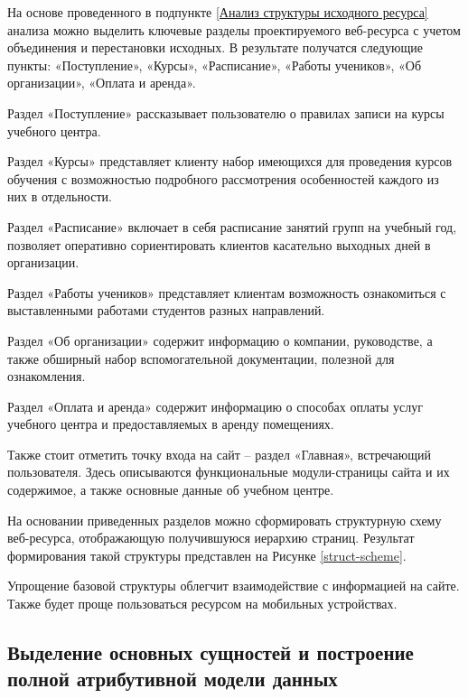 На основе проведенного в подпункте \ref{Анализ структуры исходного ресурса} анализа можно выделить ключевые разделы проектируемого веб-ресурса с учетом объединения и перестановки исходных.
В результате получатся следующие пункты: «Поступление», «Курсы», «Расписание», «Работы учеников», «Об организации», «Оплата и аренда».

Раздел «Поступление» рассказывает пользователю о правилах записи на курсы учебного центра.

Раздел «Курсы» представляет клиенту набор имеющихся для проведения курсов обучения с возможностью подробного рассмотрения особенностей каждого из них в отдельности.

Раздел «Расписание» включает в себя расписание занятий групп на учебный год, позволяет оперативно сориентировать клиентов касательно выходных дней в организации.

Раздел «Работы учеников» представляет клиентам возможность ознакомиться с выставленными работами студентов разных направлений.

Раздел «Об организации» содержит информацию о компании, руководстве, а также обширный набор вспомогательной документации, полезной для ознакомления.

Раздел «Оплата и аренда» содержит информацию о способах оплаты услуг учебного центра и предоставляемых в аренду помещениях.

Также стоит отметить точку входа на сайт -- раздел «Главная», встречающий пользователя.
Здесь описываются функциональные модули-страницы сайта и их содержимое, а также основные данные об учебном центре.

На основании приведенных разделов можно сформировать структурную схему веб-ресурса, отображающую получившуюся иерархию страниц.
Результат формирования такой структуры представлен на Рисунке \ref{struct-scheme}.


Упрощение базовой структуры облегчит взаимодействие с информацией на сайте.
Также будет проще пользоваться ресурсом на мобильных устройствах.


\subsection{Выделение основных сущностей и построение полной атрибутивной модели данных}\label{Выделение основных сущностей и построение полной атрибутивной модели данных}

